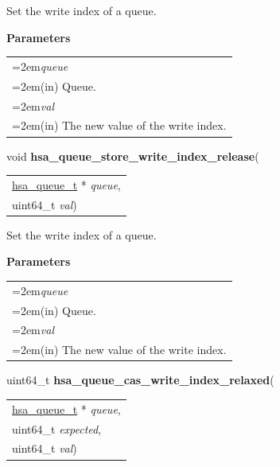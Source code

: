 \documentclass[final]{book}
\newcommand{\hsaarg}[1]{\textit{#1}}
\begin{document}
\begin{appendices}
\begin{tcolorbox}[breakable,nobeforeafter,colframe=white,colback=lightgray,left=0mm]
\end{tcolorbox}
Set the write index of a queue.

\noindent\textbf{Parameters}\\[-6mm]
\noindent\begin{longtable}{@{}>{\hangindent=2em}p{\textwidth}}
\hsaarg{queue}\\\hspace{2em}(in) Queue.\\[2mm]
\hsaarg{val}\\\hspace{2em}(in) The new value of the write index.
\end{longtable}
 


\noindent\begin{tcolorbox}[breakable,nobeforeafter,colframe=white,colback=lightgray,left=0mm]
void \hypertarget{group--queue-1ga784746f35e9c5217d51cc794452ca75b}{\textbf{hsa_queue_store_write_index_release}}(
\vspace{-3.5mm}\begin{longtable}{@{}p{\textwidth}}
\hspace{1.7em}\hyperlink{group--queue-1gacbb2835331f18aee30ee441f07b3fc5a}{hsa_queue_t} * \hsaarg{queue},\\
\hspace{1.7em}uint64_t \hsaarg{val})\end{longtable}

\end{tcolorbox}
Set the write index of a queue.

\noindent\textbf{Parameters}\\[-6mm]
\noindent\begin{longtable}{@{}>{\hangindent=2em}p{\textwidth}}
\hsaarg{queue}\\\hspace{2em}(in) Queue.\\[2mm]
\hsaarg{val}\\\hspace{2em}(in) The new value of the write index.
\end{longtable}
 


\noindent\begin{tcolorbox}[breakable,nobeforeafter,colframe=white,colback=lightgray,left=0mm]
uint64_t \hypertarget{group--queue-1ga204dd9478ffbb5d953ffadc9a2163c82}{\textbf{hsa_queue_cas_write_index_relaxed}}(
\vspace{-3.5mm}\begin{longtable}{@{}p{\textwidth}}
\hspace{1.7em}\hyperlink{group--queue-1gacbb2835331f18aee30ee441f07b3fc5a}{hsa_queue_t} * \hsaarg{queue},\\
\hspace{1.7em}uint64_t \hsaarg{expected},\\
\hspace{1.7em}uint64_t \hsaarg{val})\end{longtable}


\end{tcolorbox}
\end{appendices}
\end{document}
